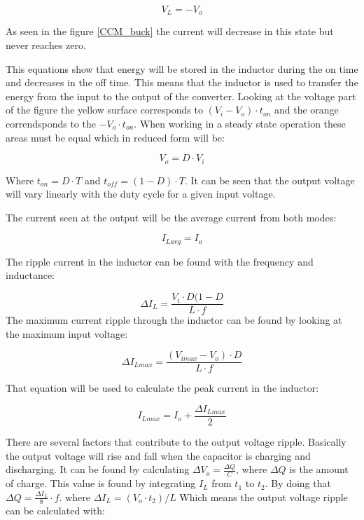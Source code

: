 \begin{equation}
V_L = -V_o
\end{equation} 

As seen in the figure \ref{CCM_buck} the current will decrease in this state but never reaches zero.

This equations show that energy will be stored in the inductor during the on time and decreases in the off time. This means that the inductor is used to transfer the energy from the input to the output of the converter. 
Looking at the voltage part of the figure the yellow surface corresponds to $(V_i-V_o)\cdot t_{on}$ and the orange correndsponds to the $-V_o\cdot t_{on}$. When working in a steady state operation these areas must be equal which in reduced form will be:

\begin{equation}
V_o = D\cdot V_i
\end{equation}

Where $t_{on}=D\cdot T$ and $t_{off}=(1-D)\cdot T$. It can be seen that the output voltage will vary linearly with the duty cycle for a given input voltage.

The current seen at the output will be the average current from both modes:

\begin{equation} \label{Iavg}
I_{Lavg}=I_o
\end{equation}

The ripple current in the inductor can be found with the frequency and inductance:

\begin{equation}\label{buckind}
\Delta I_L = \frac{V_i\cdot D(1-D}{L\cdot f}
\end{equation}
The maximum current ripple through the inductor can be found by looking at the maximum input voltage:

\begin{equation}
\Delta I_{Lmax} = \frac{(V_{imax}-V_{o})\cdot D}{L\cdot f}
\end{equation}

That equation will be used to calculate the peak current in the inductor:

\begin{equation}
I_{Lmax} = I_o + \frac{\Delta I_{Lmax}}{2}
\end{equation}

There are several factors that contribute to the output voltage ripple. Basically the output voltage will rise and fall when the capacitor is charging and discharging. It can be found by calculating $\Delta V_o = \frac{\Delta Q}{C}$, where $\Delta Q$ is the amount of charge. This value is found by integrating $I_L$ from $t_1$ to $t_2$. By doing that $\Delta Q = \frac{\Delta I_L}{8}\cdot f$. where $\Delta I_L = (V_o\cdot t_2)/L$ Which means the output voltage ripple can be calculated with:
 
